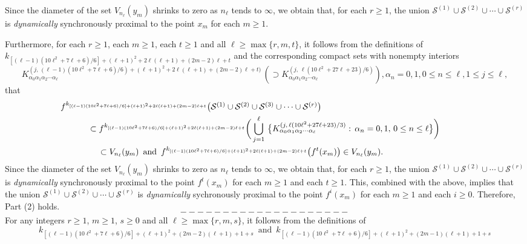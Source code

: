 \documentclass[12pt]{article}
\newcommand{\al}{\alpha}
\begin{document}
\indent Since the diameter of the set $V_{n_\ell}(y_m)$ shrinks to zero as $n_\ell$ tends to $\infty$, we obtain that, for each $r \ge 1$, the union $\mathcal S^{(1)} \cup \mathcal S^{(2)} \cup \cdots \cup \mathcal S^{(r)}$ is {\it dynamically} synchronously proximal to the point $x_m$ for each $m \ge 1$.  

Furthermore, for each $r \ge 1$, each $m \ge 1$, each $t \ge 1$ and all $\ell \ge \max \{ r, m, t \}$, it follows from the definitions of 
$k_{[(\ell-1)(10\ell^2+7\ell+6)/6]+(\ell+1)^2+2\ell(\ell+1)+(2m-2)\ell+t}$ and the corresponding compact sets with nonempty interiors 
$$
K_{\al_0\al_1\al_2\cdots\al_\ell}^{(j, \, (\ell-1)(10\ell^2+7\ell+6)/6)+(\ell+1)^2+2\ell(\ell+1)+(2m-2)\ell+t)} \, (\supset K_{\al_0\al_1\al_2\cdots\al_\ell}^{(j, \, \ell(10\ell^2+27\ell+23)/6)}), \al_n = 0, 1, 0 \le n \le \ell, 1 \le j \le \ell, 
$$
that
\begin{multline*}
$$
\,\,\, f^{k_{[(\ell-1)(10\ell^2+7\ell+6)/6]+(\ell+1)^2+2\ell(\ell+1)+(2m-2)\ell+t}}\big(\mathcal S^{(1)} \cup \mathcal S^{(2)} \cup \mathcal S^{(3)} \cup \cdots \cup \mathcal S^{(r)}\big) \qquad\qquad\qquad\qquad\qquad\qquad\qquad\quad\quad\quad\quad\\
\subset f^{k_{[(\ell-1)(10\ell^2+7\ell+6)/6]+(\ell+1)^2+2\ell(\ell+1)+(2m-2)\ell+t}}\bigg(\bigcup_{j=1}^\ell \, \big\{ K_{\al_0\al_1\al_2\cdots\al_\ell}^{(j, \, \ell(10\ell^2+27\ell+23)/3)}: \, \al_n = 0, 1, \, 0 \le n \le \ell \big\}\bigg) \\ 
\qquad\,\,\, \subset V_{n_\ell}(y_m) \,\,\, \text{and} \,\,\, f^{k_{[(\ell-1)(10\ell^2+7\ell+6)/6]+(\ell+1)^2+2\ell(\ell+1)+(2m-2)\ell+t}}\big(f^t(x_m)\big) \in V_{n_\ell}(y_m). \qquad\qquad\qquad\quad\quad
$$
\end{multline*}
\indent Since the diameter of the set $V_{n_\ell}(y_m)$ shrinks to zero as $n_\ell$ tends to $\infty$, we obtain that, for each $r \ge 1$, the union $\mathcal S^{(1)} \cup \mathcal S^{(2)} \cup \cdots \cup \mathcal S^{(r)}$ is {\it dynamically} synchronously proximal to the point $f^t(x_m)$ for each $m \ge 1$ and each $t \ge 1$.  This, combined with the above, implies that the union $\mathcal S^{(1)} \cup \mathcal S^{(2)} \cup \cdots \cup \mathcal S^{(r)}$ is {\it dynamically} sychronously proximal to the point $f^i(x_m)$ for each $m \ge 1$ and each $i \ge 0$.  Therefore, Part (2) holds.   
$$--------------------$$
\indent For any integers $r \ge 1$, $m \ge 1$, $s \ge 0$ and all $\ell \ge \max \{ r, m, s \}$, it follows from the definitions of 
$$
k_{[(\ell-1)(10\ell^2+7\ell+6)/6]+(\ell+1)^2+(2m-2)(\ell+1)+1+s} \,\,\, \text{and} \,\,\, k_{[(\ell-1)(10\ell^2+7\ell+6)/6]+(\ell+1)^2+(2m-1)(\ell+1)+1+s}
$$ 
\end{document}
